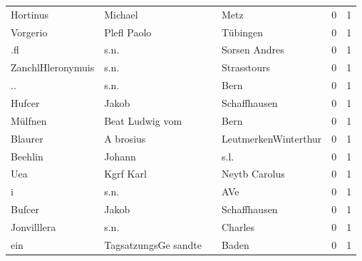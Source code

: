 \begin{center}
\begin{tiny}
\begin{longtabu}{llllrr}
                 Hortinus &                            Michael &             &                                        Metz &          0 &         1 \\
                 Vorgerio &                        Plefl Paolo &             &                                    Tübingen &          0 &         1 \\
                      .fl &                               s.n. &             &                               Sorsen Andres &          0 &         1 \\
        ZanchlHleronymuis &                               s.n. &             &                                 Strasstours &          0 &         1 \\
                       .. &                               s.n. &             &                                        Bern &          0 &         1 \\
                   Hufcer &                              Jakob &             &                                Schaffhausen &          0 &         1 \\
                  Mülfnen &                    Beat Ludwig vom &             &                                        Bern &          0 &         1 \\
                  Blaurer &                          A brosius &             &                        LeutmerkenWinterthur &          0 &         1 \\
                  Beehlin &                             Johann &             &                                        s.l. &          0 &         1 \\
                      Uea &                          Kgrf Karl &             &                               Neytb Carolus &          0 &         1 \\
                        i &                               s.n. &             &                                         AVe &          0 &         1 \\
                   Bufcer &                              Jakob &             &                                Schaffhausen &          0 &         1 \\
              Jonvilllera &                               s.n. &             &                                     Charles &          0 &         1 \\
                      ein &               TagsatzungsGe sandte &             &                                       Baden &          0 &         1 \\

\end{longtabu}
\end{tiny}
\end{center}
